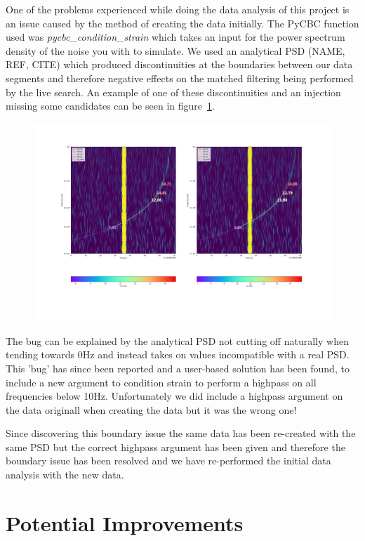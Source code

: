 One of the problems experienced while doing the data analysis of this project is an issue caused by the method of creating the data initially. The PyCBC function used was \emph{pycbc\_condition\_strain} which takes an input for the power spectrum density of the noise you with to simulate. We used an analytical PSD (NAME, REF, CITE) which produced discontinuities at the boundaries between our data segments and therefore negative effects on the matched filtering being performed by the live search. An example of one of these discontinuities and an injection missing some candidates can be seen in figure~\ref{fig:ew_boundary_problem}.
%
\begin{figure}
       \centering
    \includegraphics[width=\textwidth]{images/ew/injections_near_boundaries.png}
    \caption{}
    \label{fig:ew_boundary_problem}
\end{figure}
%
The bug can be explained by the analytical PSD not cutting off naturally when tending towards 0Hz and instead takes on values incompatible with a real PSD. This 'bug' has since been reported and a user-based solution has been found, to include a new argument to condition strain to perform a highpass on all frequencies below 10Hz. Unfortunately we did include a highpass argument on the data originall when creating the data but it was the wrong one!

Since discovering this boundary issue the same data has been re-created with the same PSD but the correct highpass argument has been given and therefore the boundary issue has been resolved and we have re-performed the initial data analysis with the new data.

\section{Potential Improvements}


